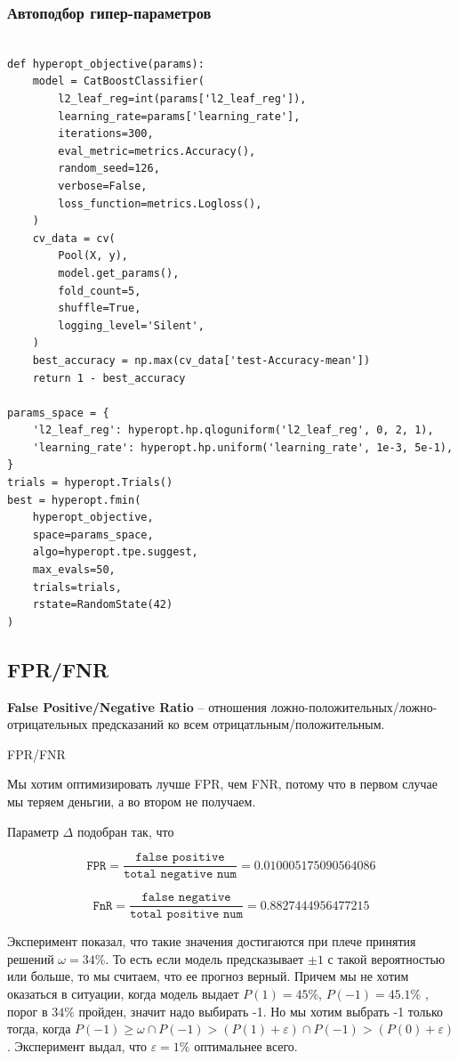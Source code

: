 \subsubsection{Автоподбор гипер-параметров}

\begin{verbatim}

def hyperopt_objective(params):
    model = CatBoostClassifier(
        l2_leaf_reg=int(params['l2_leaf_reg']),
        learning_rate=params['learning_rate'],
        iterations=300,
        eval_metric=metrics.Accuracy(),
        random_seed=126,
        verbose=False,
        loss_function=metrics.Logloss(),
    )
    cv_data = cv(
        Pool(X, y),
        model.get_params(),
        fold_count=5,
        shuffle=True,
        logging_level='Silent',
    )
    best_accuracy = np.max(cv_data['test-Accuracy-mean'])
    return 1 - best_accuracy

params_space = {
    'l2_leaf_reg': hyperopt.hp.qloguniform('l2_leaf_reg', 0, 2, 1),
    'learning_rate': hyperopt.hp.uniform('learning_rate', 1e-3, 5e-1),
}
trials = hyperopt.Trials()
best = hyperopt.fmin(
    hyperopt_objective,
    space=params_space,
    algo=hyperopt.tpe.suggest,
    max_evals=50,
    trials=trials,
    rstate=RandomState(42)
)

\end{verbatim}

\subsection{FPR/FNR}

 \textbf{False Positive/Negative Ratio} -- отношения ложно-положительных/ложно-отрицательных предсказаний ко всем отрицатльным/положительным.

\designation FPR/FNR

Мы хотим оптимизировать лучше FPR, чем FNR, потому что в первом случае мы теряем деньгии, а во втором не получаем.

Параметр $\Delta$ подобран так, что

$$\texttt{FPR} = \frac{\texttt{false positive}}{\texttt{total negative num}} = 0.010005175090564086$$

$$\texttt{FnR} = \frac{\texttt{false negative}}{\texttt{total positive num}} = 0.8827444956477215$$

Эксперимент показал, что такие значения достигаются при плече принятия решений $\omega = 34\%$. То есть если модель предсказывает $\pm 1$ с такой вероятностью или больше, то мы считаем, что ее прогноз верный. Причем мы не хотим оказаться в ситуации, когда модель выдает $P(1) = 45\%$, $P(-1) = 45.1\%$ , порог в $34\%$ пройден, значит надо выбирать -1. Но мы хотим выбрать -1 только тогда, когда $P(-1) \geqslant \omega \cap P(-1) > (P(1) + \varepsilon) \cap P(-1) > (P(0) + \varepsilon)$. Эксперимент выдал, что $\varepsilon = 1\%$ оптимальнее всего.

